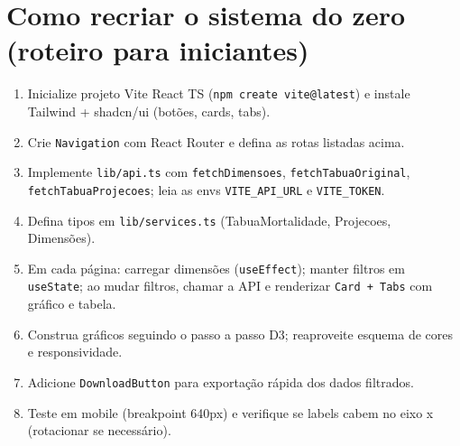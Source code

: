\documentclass[12pt,a4paper]{article}
\begin{document}
\section{Como recriar o sistema do zero (roteiro para iniciantes)}
\begin{enumerate}[leftmargin=*]
  \item Inicialize projeto Vite React TS (\texttt{npm create vite@latest}) e instale Tailwind + shadcn/ui (botões, cards, tabs).
  \item Crie \texttt{Navigation} com React Router e defina as rotas listadas acima.
  \item Implemente \texttt{lib/api.ts} com \texttt{fetchDimensoes}, \texttt{fetchTabuaOriginal}, \texttt{fetchTabuaProjecoes}; leia as envs \texttt{VITE\_API\_URL} e \texttt{VITE\_TOKEN}.
  \item Defina tipos em \texttt{lib/services.ts} (TabuaMortalidade, Projecoes, Dimensões).
  \item Em cada página: carregar dimensões (\texttt{useEffect}); manter filtros em \texttt{useState}; ao mudar filtros, chamar a API e renderizar \texttt{Card + Tabs} com gráfico e tabela.
  \item Construa gráficos seguindo o passo a passo D3; reaproveite esquema de cores e responsividade.
  \item Adicione \texttt{DownloadButton} para exportação rápida dos dados filtrados.
  \item Teste em mobile (breakpoint 640px) e verifique se labels cabem no eixo x (rotacionar se necessário).
\end{enumerate}
\end{document}
